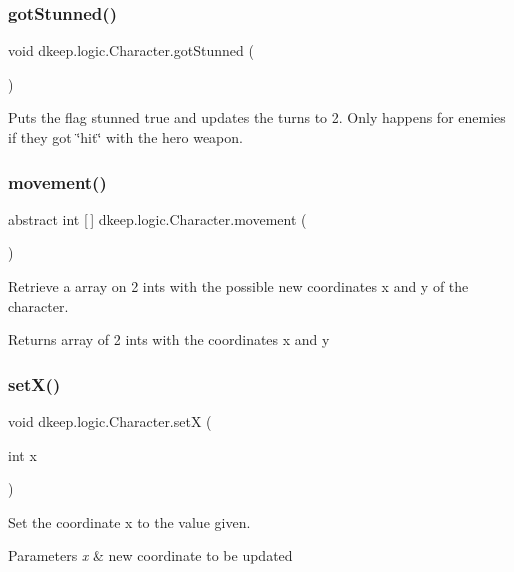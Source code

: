 \subsubsection{\texorpdfstring{got\+Stunned()}{gotStunned()}}
{\footnotesize\ttfamily void dkeep.\+logic.\+Character.\+got\+Stunned (\begin{DoxyParamCaption}{ }\end{DoxyParamCaption})}

Puts the flag stunned true and updates the turns to 2. Only happens for enemies if they got \char`\"{}hit\char`\"{} with the hero weapon. \mbox{\label{classdkeep_1_1logic_1_1_character_a400aadf032a66c591f4ad6ca2660f3f2}} 
\subsubsection{\texorpdfstring{movement()}{movement()}}
{\footnotesize\ttfamily abstract int \mbox{[}$\,$\mbox{]} dkeep.\+logic.\+Character.\+movement (\begin{DoxyParamCaption}{ }\end{DoxyParamCaption})\hspace{0.3cm}{\ttfamily [abstract]}}

Retrieve a array on 2 ints with the possible new coordinates x and y of the character. \begin{DoxyReturn}{Returns}
array of 2 ints with the coordinates x and y 
\end{DoxyReturn}
\mbox{\label{classdkeep_1_1logic_1_1_character_a5e41fc20fed934fc02bf114f603e540b}} 
\subsubsection{\texorpdfstring{set\+X()}{setX()}}
{\footnotesize\ttfamily void dkeep.\+logic.\+Character.\+setX (\begin{DoxyParamCaption}\item[{int}]{x }\end{DoxyParamCaption})}

Set the coordinate x to the value given. 
\begin{DoxyParams}{Parameters}
{\em x} & new coordinate to be updated \\
\hline
\end{DoxyParams}
\mbox{\label{classdkeep_1_1logic_1_1_character_aef6651cd827a83c4518e4dcba4ead2b4}} 
